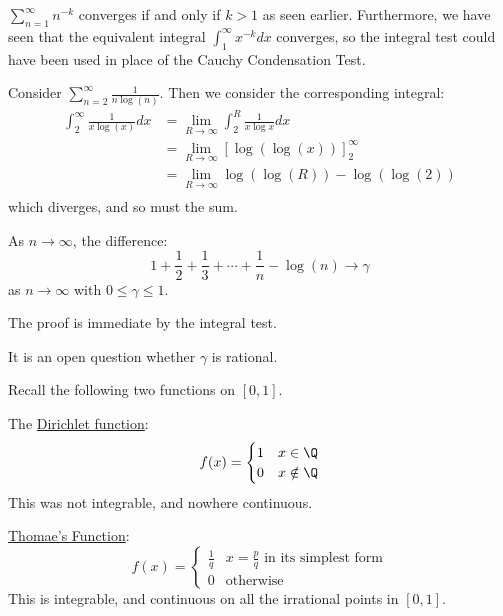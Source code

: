 \documentclass[../Main.tex]{subfiles}
\begin{document}
\begin{examples}{}
    \item $\sum_{n = 1}^\infty n^{-k}$ converges if and only if $k > 1$ as seen earlier. Furthermore, we have seen that the equivalent integral $\int_1^\infty x^{-k} dx$ converges, so the integral test could have been used in place of the Cauchy Condensation Test.
    \item Consider $\sum_{n = 2}^\infty \frac{1}{n \log(n)}$. Then we consider the corresponding integral:
        \begin{align*}
            \int_2^\infty \frac{1}{x \log(x)}dx &= \lim_{R \to \infty} \int_2^R \frac{1}{x \log{x}} dx \\
            &= \lim_{R \to \infty} \left[\log(\log(x))\right]_2^\infty \\
            &= \lim_{R \to \infty} \log(\log(R)) - \log(\log(2)) \\
        \end{align*}
        which diverges, and so must the sum.
\end{examples}
\begin{corollary}
    As $n \to \infty$, the difference:
    \begin{equation*}
        1 + \frac{1}{2} + \frac{1}{3} + \cdots + \frac{1}{n} - \log(n) \to \gamma
    \end{equation*}
    as $n \to \infty$ with $0 \leq \gamma \leq 1$.
\end{corollary}
The proof is immediate by the integral test.

\begin{remark}
    It is an open question whether $\gamma$ is rational.
\end{remark}
Recall the following two functions on $[0, 1]$.

The \underline{Dirichlet function}:
\begin{equation*}
    f(x) = 
    \begin{cases}
        1 & x \in \Q \\
        0 & x \notin \Q
    \end{cases}
\end{equation*}
This was not integrable, and nowhere continuous.

\underline{Thomae's Function}:
\begin{equation*}
    f(x) =
    \begin{cases}
        \frac{1}{q} & x = \frac{p}{q} \text{ in its simplest form} \\
        0 & \text{otherwise}
    \end{cases}
\end{equation*}
This is integrable, and continuous on all the irrational points in $[0, 1]$.
\end{document}

